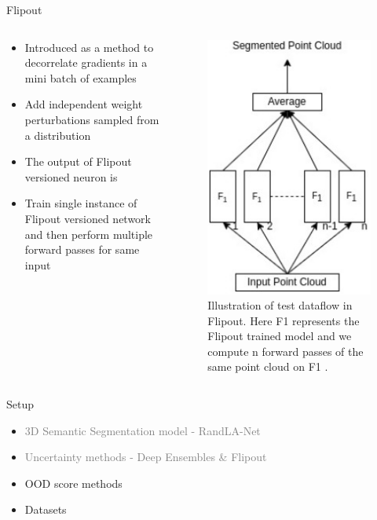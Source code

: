 \documentclass[aspectratio=169]{beamer}
\begin{document}
\begin{frame}{Flipout}
    \begin{columns}
        \begin{column}{0.5\textwidth}
            \begin{itemize}
                \item Introduced as a method to decorrelate gradients in a mini batch of examples
                \item Add independent weight perturbations sampled from a distribution
                \item The output of Flipout versioned neuron is 
                
                \item Train single instance of Flipout versioned network and then perform multiple forward passes for same input
            \end{itemize}
        \end{column}
        \begin{column}{0.5\textwidth}
            \begin{figure}
                \centering
                \includegraphics[scale=0.45]{images/flipout.jpg}
                \caption{Illustration of test dataflow in Flipout. Here F1 represents the Flipout trained model and we
                compute n forward passes of the same point cloud on F1 .}
                \label{fig:flipout_work}
            \end{figure}
        \end{column}
    \end{columns}
\end{frame}
\begin{frame}[noframenumbering]{Setup}
    \begin{itemize}
        
        \item \textcolor{gray}{3D Semantic Segmentation model - RandLA-Net}
        \item \textcolor{gray}{Uncertainty methods - Deep Ensembles \& Flipout}
        \item OOD score methods
        \item Datasets
    \end{itemize}
\end{frame}
\end{document}
